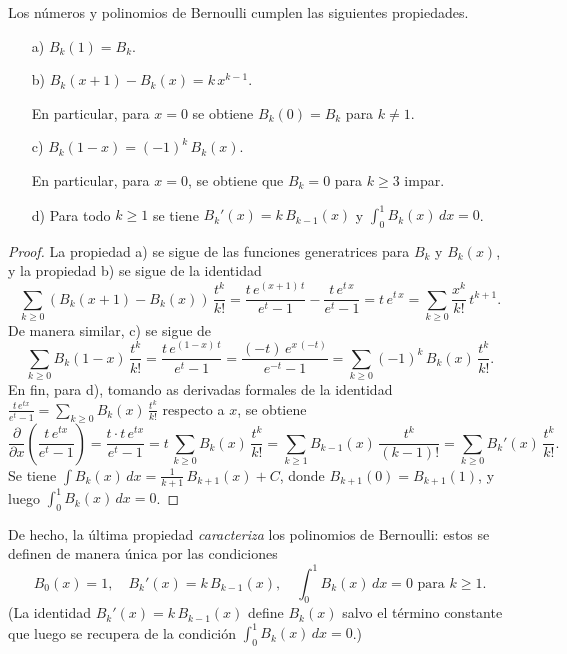 \begin{proposicion}
  Los números y polinomios de Bernoulli cumplen las siguientes propiedades.

  \begin{enumerate}
  \item[a)] $B_k (1) = B_k$.

  \item[b)] $B_k (x+1) - B_k (x) = k\,x^{k-1}$.

    En particular, para $x = 0$ se obtiene $B_k (0) = B_k$ para $k \ne 1$.

  \item[c)] $B_k (1-x) = (-1)^k\,B_k (x)$.

    En particular, para $x = 0$, se obtiene que $B_k = 0$ para $k \ge 3$ impar.

  \item[d)] Para todo $k \ge 1$ se tiene
    $B_k' (x) = k\,B_{k-1} (x)$ y $\int_0^1 B_k (x)\,dx = 0$.
  \end{enumerate}

  \begin{proof}
    La propiedad a) se sigue de las funciones generatrices para $B_k$ y $B_k (x)$,
    y la propiedad b) se sigue de la identidad
    \[ \sum_{k\ge 0} (B_k (x+1) - B_k (x))\,\frac{t^k}{k!} =
       \frac{t\,e^{(x+1)\,t}}{e^t-1} - \frac{t\,e^{t\,x}}{e^t-1} =
       t\,e^{t\,x} = \sum_{k \ge 0} \frac{x^k}{k!}\,t^{k+1}. \]
    De manera similar, c) se sigue de
    \[ \sum_{k\ge 0} B_k (1-x)\,\frac{t^k}{k!} =
       \frac{t\,e^{(1-x)\,t}}{e^t - 1} =
       \frac{(-t)\,e^{x\,(-t)}}{e^{-t} - 1} =
       \sum_{k\ge 0} (-1)^k\,B_k (x)\,\frac{t^k}{k!}. \]
    En fin, para d), tomando as derivadas formales de la identidad
    $\frac{t\,e^{tx}}{e^t - 1} = \sum_{k \ge 0} B_k (x) \, \frac{t^k}{k!}$
    respecto a $x$, se obtiene
    \[ \frac{\partial}{\partial x} \left(\frac{t\,e^{tx}}{e^t - 1}\right) =
       \frac{t\cdot t\,e^{tx}}{e^t - 1} =
       t\,\sum_{k \ge 0} B_k (x) \, \frac{t^k}{k!} =
       \sum_{k \ge 1} B_{k-1} (x) \, \frac{t^k}{(k-1)!} =
       \sum_{k \ge 0} B_k' (x) \, \frac{t^k}{k!}. \]
    Se tiene $\int B_k (x)\,dx = \frac{1}{k+1}\,B_{k+1} (x) + C$, donde $B_{k+1}
    (0) = B_{k+1} (1)$, y luego $\int_0^1 B_k (x)\,dx = 0$.
  \end{proof}
\end{proposicion}

De hecho, la última propiedad \emph{caracteriza} los polinomios de Bernoulli:
estos se definen de manera única por las condiciones
\[ B_0 (x) = 1, \quad
   B_k' (x) = k\,B_{k-1} (x), \quad
   \int_0^1 B_k (x) \, dx = 0\text{ para }k \ge 1. \]
(La identidad $B_k' (x) = k\,B_{k-1} (x)$ define $B_k (x)$ salvo el término
constante que luego se recupera de la condición $\int_0^1 B_k (x) \, dx = 0$.)

